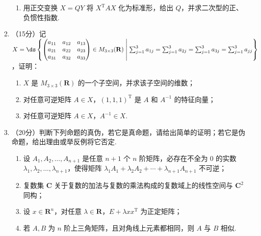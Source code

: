 \begin{enumerate}
\begin{enumerate}
        \item 用正交变换 $X=QY$ 将 $X^{\mathrm{T}}AX$ 化为标准形，给出 $Q$，并求二次型的正、负惯性指数.
    \end{enumerate}
	\item （15分）记 $X=\ds\left\{\begin{pmatrix}a_{11} & a_{12} & a_{13} \\ a_{21} & a_{22} & a_{23} \\ a_{31} & a_{32} & a_{33}\end{pmatrix} \in M_{3 \times 3}(\mathbf{R}) \;\middle|\; \sum_{j=1}^3a_{1j}=\sum_{j=1}^3a_{2j}=\sum_{j=1}^3a_{3j}=\sum_{j=1}^3a_{jj}\right\}$，证明：
    \begin{enumerate}
        \item $X$ 是 $M_{3 \times 3}(\mathbf{R})$ 的一个子空间，并求该子空间的维数；

        \item 对任意可逆矩阵 $A \in X$，$(1, 1, 1)^{\mathrm{T}}$ 是 $A$ 和 $A^{-1}$ 的特征向量；

        \item 对任意可逆矩阵 $A \in X$，$A^{-1} \in X$.
    \end{enumerate}
	\item （20分）判断下列命题的真伪，若它是真命题，请给出简单的证明；若它是伪命题，给出理由或举反例将它否定.
    \begin{enumerate}
        \item 设 $A_1, A_2, \ldots, A_{n+1}$ 是任意 $n+1$ 个 $n$ 阶矩阵，必存在不全为 0 的实数 $\lambda_1,\allowbreak \lambda_2,\allowbreak \ldots,\allowbreak \lambda_{n+1}$，使得矩阵 $\lambda_1A_1+\lambda_2A_2+\cdots+\lambda_{n+1}A_{n+1}$ 不可逆；

        \item 复数集 $\mathbf{C}$ 关于复数的加法与复数的乘法构成的复数域上的线性空间与 $\mathbf{C}^2$ 同构；

        \item 设 $x \in \mathbf{R}^n$，对任意 $\lambda \in \mathbf{R}$，$E+\lambda xx^{\mathrm{T}}$ 为正定矩阵；

        \item 若 $A, B$ 为 $n$ 阶上三角矩阵，且对角线上元素都相同，则 $A$ 与 $ B$ 相似.
    \end{enumerate}
\end{enumerate}

\clearpage
